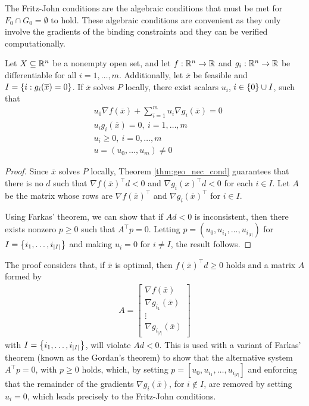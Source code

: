 The Fritz-John conditions are the algebraic conditions that must be met for $F_0 \cap G_0 = \emptyset$ to hold. These algebraic conditions are convenient as they only involve the gradients of the binding constraints and they can be verified computationally.
%
\begin{theorem} \label{thm:FJ_conditions}
Let $X \subseteq \mathbb{R}^n$ be a nonempty open set, and let $f:\mathbb{R}^n \rightarrow \mathbb{R}$ and $g_i:\mathbb{R}^n \rightarrow \mathbb{R}$ be differentiable for all $i = 1, \dots,m$. Additionally, let $\overline{x}$ be feasible and $I = \left\{ i : g_i(\overline{x}) = 0 \right \}$. If $\overline{x}$ solves $P$ locally, there exist scalars $u_i$, $i \in \left\{ 0 \right \} \cup I$, such that
\begin{align*}
& u_0 \nabla f(\overline{x}) + \sum_{i=1}^m u_i \nabla g_i(\overline{x}) = 0\\
& u_i g_i(\overline{x}) = 0, \ i = 1,\dots,m\\
&u_i \geq 0, \ i = 0, \dots, m\\
&u = (u_0,\dots, u_m) \neq 0
\end{align*}
\end{theorem}
%
\begin{proof}
Since $\overline{x}$ solves $P$ locally, Theorem \ref{thm:geo_nec_cond} guarantees that there is no $d$ such that $\nabla f(\overline{x})^\top d < 0$ and $\nabla g_i(x)^\top d < 0$ for each $i \in I$. Let $A$ be the matrix whose rows are $\nabla f(\overline{x})^\top$ and $\nabla g_i(\overline{x})^\top$ for $i \in I$. 

Using Farkas' theorem, we can show that if $Ad < 0$ is inconsistent, then there exists nonzero $p \geq 0$ such that $A^\top p = 0$. Letting $p =(u_0, u_{i_1}, \dots, u_{i_{|I|}})$ for $I = \left\{ i_1, \dots, i_{|I|} \right \}$ and making $u_i = 0$ for $i \neq I$, the result follows. 
\end{proof}

The proof considers that, if $\overline{x}$ is optimal, then $f(\overline{x})^\top d \geq 0$ holds and a matrix $A$ formed by 
\begin{align*}
	A = \begin{bmatrix}
		\nabla f(\overline{x}) \\
		\nabla g_{i_1}(\overline{x})\\
		\vdots \\
		\nabla g_{i_|I|}(\overline{x})
	\end{bmatrix}
\end{align*}
with $I = \left\{ i_1, \dots, i_{|I|} \right \}$, will violate $Ad<0$. This is used with a variant of Farkas' theorem (known as the Gordan's theorem) to show that the alternative system $A^\top p = 0$, with $p \geq 0$ holds, which, by setting $p = [u_0, u_{i_1}, \dots, u_{i_|I|}]$ and enforcing that the remainder of the gradients $\nabla g_i(\overline{x})$, for $i \notin I$, are removed by setting $u_i = 0$, which leads precisely to the Fritz-John conditions.

